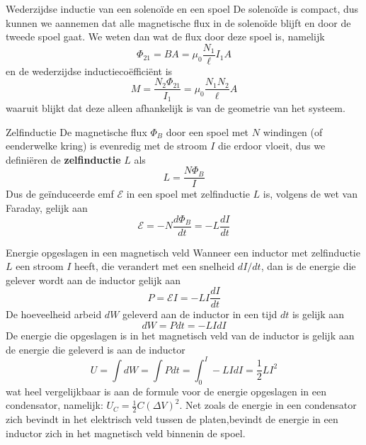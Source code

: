 \begin{app}{Wederzijdse inductie van een solenoïde en een spoel}
    De solenoïde is compact, dus kunnen we aannemen dat alle magnetische flux in de solenoïde blijft en door de tweede spoel gaat.
    We weten dan wat de flux door deze spoel is, namelijk
    \begin{equation*}
        \Phi_{21} = BA = \mu_{0}\dfrac{N_{1}}{\ell}I_{1}A
    \end{equation*}
    en de wederzijdse inductiecoëfficiënt is
    \begin{equation*}
        M = \dfrac{N_{2}\Phi_{21}}{I_{1}} = \mu_{0}\dfrac{N_{1}N_{2}}{\ell}A
    \end{equation*}
    waaruit blijkt dat deze alleen afhankelijk is van de geometrie van het systeem.
\end{app}


\begin{theo}[Zelfinductie]{Zelfinductie}
    De magnetische flux $\Phi_{B}$ door een spoel met $N$ windingen (of eenderwelke kring) is evenredig met de stroom $I$ die erdoor vloeit, dus we definiëren de \textbf{zelfinductie} $L$ als
    \begin{equation*}
        L = \dfrac{N\Phi_{B}}{I}
    \end{equation*}
    Dus de geïnduceerde emf $\mathcal{E}$ in een spoel met zelfinductie $L$ is, volgens de wet van Faraday, gelijk aan
    \begin{equation*}
        \mathcal{E} = -N\dfrac{d\Phi_{B}}{dt }= - L\dfrac{dI}{dt}
    \end{equation*}
    \vspace{-0.3cm}
\end{theo}

\newpage

\begin{app}{Energie opgeslagen in een magnetisch veld}
    Wanneer een inductor met zelfinductie $L$ een stroom $I$ heeft, die verandert met een snelheid $dI/dt$, dan is de energie die 
    gelever wordt aan de inductor gelijk aan 
    \begin{equation*}
        P = \mathcal{E}I = -LI\dfrac{dI}{dt}
    \end{equation*}
    De hoeveelheid arbeid $dW$ geleverd aan de inductor in een tijd $dt$ is gelijk aan
    \begin{equation*}
        dW = Pdt = -LIdI
    \end{equation*}
    De energie die opgeslagen is in het magnetisch veld van de inductor is gelijk aan de energie die geleverd is aan de inductor
    \begin{equation*}
        U = \int dW = \int Pdt = \int_{0}^{I} -LIdI = \dfrac{1}{2}LI^{2}
    \end{equation*}
    wat heel vergelijkbaar is aan de formule voor de energie opgeslagen in een condensator, namelijk: $U_{C} = \frac{1}{2}C(\Delta V)^{2}$. 
    Net zoals de energie in een condensator zich bevindt in het elektrisch veld tussen de platen,bevindt de energie in een inductor zich in het magnetisch veld binnenin de spoel.
\end{app}

